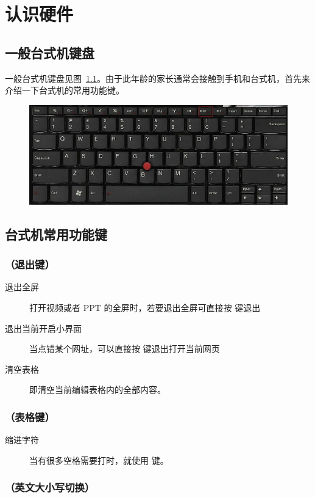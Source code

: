 \chapter{认识硬件}
\section{一般台式机键盘}
一般台式机键盘见图~\ref{fig:1}。由于此年龄的家长通常会接触到手机和台式机，首先来介绍一下台式机的常用功能键。
\begin{figure}[htbp]
	\centering
	\includegraphics[width=0.7\linewidth]{figure/键盘}
	\caption{}
	\label{fig:1}
\end{figure}
\section[台式机常用功能键]{台式机常用功能键\footnotemark}
\subsection{ （退出键）}
\begin{description}
	\item [退出全屏]
	打开视频或者 PPT 的全屏时，若要退出全屏可直接按  键退出
	\item [退出当前开启小界面]
	当点错某个网址，可以直接按  键退出打开当前网页
	\item [清空表格]
	即清空当前编辑表格内的全部内容。
\end{description}

\subsection{ （表格键）}
\begin{description}
	\item [缩进字符]
	当有很多空格需要打时，就使用  键。
\end{description}
\subsection{ （英文大小写切换）}
